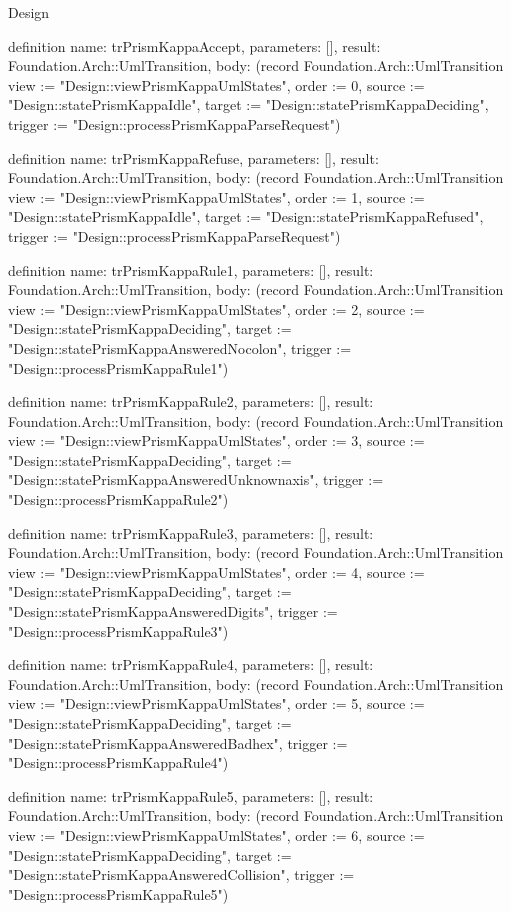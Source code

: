 \begin{lexlean}{Design}
\begin{semanticmodule}
definition{
  name: trPrismKappaAccept,
  parameters: [],
  result: Foundation.Arch::UmlTransition,
  body: (record Foundation.Arch::UmlTransition {view := "Design::viewPrismKappaUmlStates", order := 0, source := "Design::statePrismKappaIdle", target := "Design::statePrismKappaDeciding", trigger := "Design::processPrismKappaParseRequest"})
}

definition{
  name: trPrismKappaRefuse,
  parameters: [],
  result: Foundation.Arch::UmlTransition,
  body: (record Foundation.Arch::UmlTransition {view := "Design::viewPrismKappaUmlStates", order := 1, source := "Design::statePrismKappaIdle", target := "Design::statePrismKappaRefused", trigger := "Design::processPrismKappaParseRequest"})
}

definition{
  name: trPrismKappaRule1,
  parameters: [],
  result: Foundation.Arch::UmlTransition,
  body: (record Foundation.Arch::UmlTransition {view := "Design::viewPrismKappaUmlStates", order := 2, source := "Design::statePrismKappaDeciding", target := "Design::statePrismKappaAnsweredNocolon", trigger := "Design::processPrismKappaRule1"})
}

definition{
  name: trPrismKappaRule2,
  parameters: [],
  result: Foundation.Arch::UmlTransition,
  body: (record Foundation.Arch::UmlTransition {view := "Design::viewPrismKappaUmlStates", order := 3, source := "Design::statePrismKappaDeciding", target := "Design::statePrismKappaAnsweredUnknownaxis", trigger := "Design::processPrismKappaRule2"})
}

definition{
  name: trPrismKappaRule3,
  parameters: [],
  result: Foundation.Arch::UmlTransition,
  body: (record Foundation.Arch::UmlTransition {view := "Design::viewPrismKappaUmlStates", order := 4, source := "Design::statePrismKappaDeciding", target := "Design::statePrismKappaAnsweredDigits", trigger := "Design::processPrismKappaRule3"})
}

definition{
  name: trPrismKappaRule4,
  parameters: [],
  result: Foundation.Arch::UmlTransition,
  body: (record Foundation.Arch::UmlTransition {view := "Design::viewPrismKappaUmlStates", order := 5, source := "Design::statePrismKappaDeciding", target := "Design::statePrismKappaAnsweredBadhex", trigger := "Design::processPrismKappaRule4"})
}

definition{
  name: trPrismKappaRule5,
  parameters: [],
  result: Foundation.Arch::UmlTransition,
  body: (record Foundation.Arch::UmlTransition {view := "Design::viewPrismKappaUmlStates", order := 6, source := "Design::statePrismKappaDeciding", target := "Design::statePrismKappaAnsweredCollision", trigger := "Design::processPrismKappaRule5"})
}


\end{semanticmodule}
\end{lexlean}

